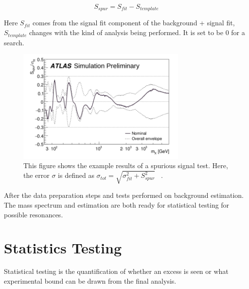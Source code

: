     \begin{equation}
        S_{spur} = S_{fit} - S_{template}
    \end{equation}

    Here $S_{fit}$ comes from the signal fit component of the background + signal fit, $S_{template}$ changes with the kind of analysis being performed. It is set to be 0 for a search.     

\begin{figure}[!htb]
    \begin{center}
        \includegraphics[width=0.75\textwidth]{figures/chapter_analysismethod/Spurious}
        \caption{
            This figure shows the example results of a spurious signal test. Here, the error $\sigma$ is defined as $\sigma_{tot} = \sqrt{\sigma^{2}_{fit}+ S_{spur}^{2}}$ ~\cite{ATL-PHYS-PUB-2020-028}.
        }
        \label{spurioussignal}
    \end{center}
\end{figure}
\FloatBarrier

After the data preparation steps and tests performed on background estimation. The mass spectrum and estimation are both ready for statistical testing for possible resonances. 

\section{Statistics Testing}
\label{section:stats}
Statistical testing is the quantification of whether an excess is seen or what experimental bound can be drawn from the final analysis. 

